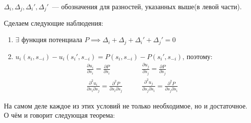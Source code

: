 \begin{df}
  $\Delta_i, \Delta_j, \Delta_i', \Delta_j'$~--- обозначения для разностей, указанных выше(в левой части).
\end{df}

\begin{remrk}
  Сделаем следующие наблюдения: 
  \begin{enumerate}
    \item $\exists$ функция потенциала $P \implies \Delta_i + \Delta_j + \Delta_i' + \Delta_j' = 0$  
    \item $u_i(s_i, s_{-i}) - u_i(s_i', s_{-i}) = P(s_i, s_{-i}) - P(s_i', s_{-i}) $,
      поэтому: 
      \begin{align*}
	\frac{\partial u_i}{\partial s_i} = \frac{\partial P}{\partial s_i} \quad&\quad \frac{\partial u_j}{\partial s_j} = \frac{\partial P}{\partial s_j} \\
	\frac{\partial^2 u_i}{\partial s_i \partial s_j} = \frac{\partial^2 P}{\partial s_i \partial s_j} \quad&\quad \frac{\partial^2 u_j}{\partial s_j \partial s_i} = \frac{\partial^2 P}{\partial s_j \partial s_i}
\end{align*}
  \end{enumerate}

  На самом деле каждое из этих условий не только необходимое, но и достаточное. О чём и говорит следующая теорема:
\end{remrk}

